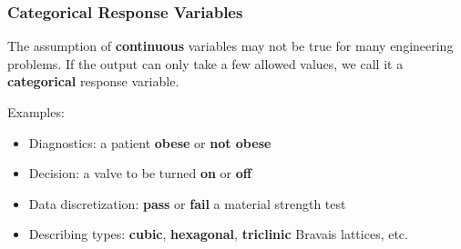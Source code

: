 \documentclass[10pt,aspectratio=169]{beamer}
\begin{document}
\begin{frame}
  \frametitle{Categorical Response Variables}

  The assumption of \textbf{continuous} variables may not be true for
  many engineering problems.  If the output can only take a few
  allowed values, we call it a \textbf{categorical} response variable.

  \vfill Examples:

  \begin{itemize}
    \vfill \item Diagnostics: a patient \textbf{obese} or \textbf{not
      obese} \vfill \item Decision: a valve to be turned \textbf{on}
    or \textbf{off} \vfill \item Data discretization: \textbf{pass} or
    \textbf{fail} a material strength test \vfill \item Describing
    types: \textbf{cubic}, \textbf{hexagonal}, \textbf{triclinic}
    Bravais lattices, etc.

  \end{itemize}

  \vspace{2em}

\end{frame}
\end{document}
